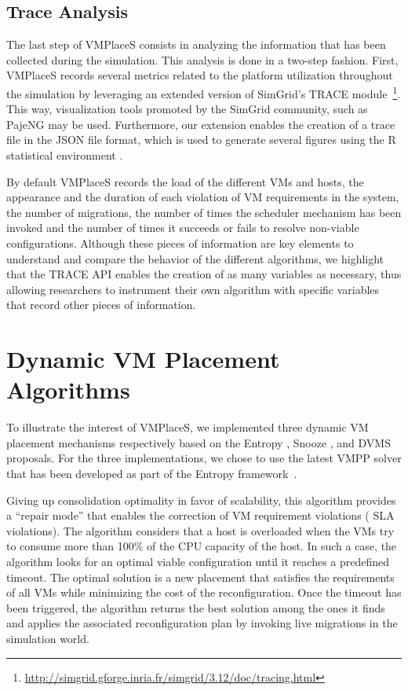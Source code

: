 \documentclass[conference]{IEEEtran}
\newcommand{\sg}{SimGrid\xspace}
\newcommand{\vmps}{VMPlaceS\xspace}
\begin{document}
\subsection{Trace Analysis}
\label{subsec:traces-analysis}

The last step of \vmps consists in analyzing the information that has
been collected during the simulation.
This analysis is done in a two-step fashion. First, \vmps records
several metrics related to the platform utilization throughout the
simulation by leveraging an extended version of \sg's TRACE
module~\footnote{\url{http://simgrid.gforge.inria.fr/simgrid/3.12/doc/tracing.html}}.
This way, visualization tools promoted by the \sg community, such as
PajeNG \cite{pageng:www} may be used. Furthermore, our extension
enables the creation of a trace file in the JSON file format, which is
used to generate several figures using the R statistical environment
\cite{R:Bloomfield:2014}.

By default \vmps records the load of the different VMs and hosts, the
appearance and the duration of each violation of VM requirements in
the system, the number of migrations, the number of times the
scheduler mechanism has been invoked and the number of times it
succeeds or fails to resolve non-viable configurations.
%
Although these pieces of information are key elements to understand
and compare the behavior of the different algorithms, we highlight
that the TRACE API enables the creation of as many variables as
necessary, thus allowing researchers to instrument their own algorithm
with specific variables that record other pieces of information.

\section{Dynamic VM Placement Algorithms}
\label{sec:vm-schedulers}
To illustrate the interest of \vmps, we implemented three dynamic VM
placement mechanisms respectively based on the Entropy
\cite{Hermenier:2009:ECM:1508293.1508300}, Snooze
\cite{feller:ccgrid12}, and DVMS \cite{quesnel:cpe2012} proposals. For the three
implementations, we chose to use the latest VMPP solver that has been
developed as part of the Entropy
framework~\cite{Hermenier:2009:ECM:1508293.1508300, hermenier:cp11}.

%
Giving up consolidation
optimality in favor of scalability, this algorithm provides a ``repair
mode'' that enables the correction of VM requirement violations (\aka
SLA violations). The algorithm considers that a host is
overloaded when the VMs try to consume more than 100\% of the CPU
capacity of the host. In such a case, the algorithm looks for
an optimal viable configuration until it reaches a predefined timeout.
The optimal solution is a new placement that satisfies
the requirements of all VMs while minimizing the cost of the
reconfiguration.
Once the timeout has been triggered, the algorithm returns
the best solution among the ones it finds and applies the associated
reconfiguration plan by invoking live migrations in the simulation
world.
\end{document}
